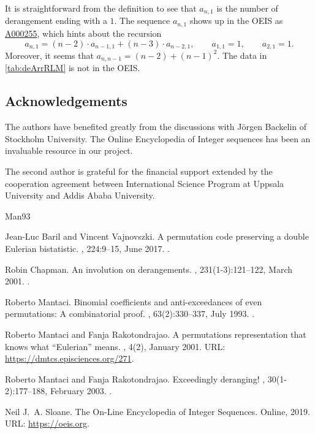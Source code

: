 \documentclass[reqno]{amsart}
\theoremstyle{definition}
\newcommand{\oeis}[1]{\href{http://oeis.org/#1}{#1}}
\begin{document}
It is straightforward from the definition to see that $a_{n,1}$ is the number of derangement ending with a $1$.
The sequence $a_{n,1}$ shows up in the OEIS as \oeis{A000255}, which hints about the recursion
\[
 a_{n,1} = (n-2) \cdot a_{n-1,1} + (n-3) \cdot a_{n-2,1}, \qquad a_{1,1} =1, \qquad a_{2,1} =1.
\]
Moreover, it seems that $a_{n,n-1} = (n-2) + (n-1)^2$.
The data in \cref{tab:deArrRLM} is not in the OEIS.


\subsection*{Acknowledgements}

The authors have benefited greatly from the discussions
with Jörgen Backelin of Stockholm University.
The Online Encyclopedia of Integer sequences \cite{OEIS} 
has been an invaluable resource in our project.

The second author is grateful for the financial support extended
by the cooperation agreement between International Science Program
at Uppsala University and Addis Ababa University.



% 

\begin{thebibliography}{Man93}

Jean-Luc Baril and Vincent Vajnovszki.
\newblock A permutation code preserving a double {E}ulerian bistatistic.
, 224:9--15, June 2017.
\newblock \href {https://doi.org/10.1016/j.dam.2017.02.014}
  {}.

Robin Chapman.
\newblock An involution on derangements.
, 231(1-3):121--122, March 2001.
\newblock \href {https://doi.org/10.1016/s0012-365x(00)00310-1}
  {}.

Roberto Mantaci.
\newblock Binomial coefficients and anti-exceedances of even permutations: A
  combinatorial proof.
, 63(2):330--337, July
  1993.
\newblock \href {https://doi.org/10.1016/0097-3165(93)90064-f}
  {}.

Roberto Mantaci and Fanja Rakotondrajao.
\newblock A permutations representation that knows what ``{E}ulerian'' means.
, 4(2),
  January 2001.
\newblock URL: \url{https://dmtcs.episciences.org/271}.

Roberto Mantaci and Fanja Rakotondrajao.
\newblock Exceedingly deranging!
, 30(1-2):177--188, February
  2003.
\newblock \href {https://doi.org/10.1016/s0196-8858(02)00531-6}
  {}.

Neil J.~A. Sloane.
\newblock The {O}n-{L}ine {E}ncyclopedia of {I}nteger {S}equences.
\newblock Online, 2019.
\newblock URL: \url{https://oeis.org}.

\end{thebibliography}
\end{document}
